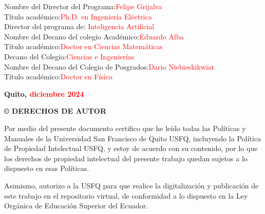 \documentclass[journal]{IEEEtran}
\newenvironment{customfontsize}{
    \fontsize{12}{14}\selectfont
}{}
\begin{document}
\begin{customfontsize}
Nombre del Director del Programa:\hspace{3cm}\textcolor{red} {Felipe Grijalva}\\
Título académico:\hspace{6.2cm}\textcolor{red}{Ph.D. en Ingeniería Eléctrica}\\
Director del programa de:\hspace{4.7cm}\textcolor{red}{ Inteligencia Artificial}
\vspace{30pt}
\\Nombre del Decano del colegio Académico:\hspace{1.6cm}\textcolor{red}{Eduardo Alba}\\ 
Título académico:\hspace{6.2cm}\textcolor{red}{Doctor en Ciencias Matemáticas}\\
Decano del Colegio:\hspace{5.8cm}\textcolor{red}{Ciencias e Ingenierías}
\vspace{30pt}
\\Nombre del Decano del Colegio de Posgrados:\hspace{1cm}\textcolor{red}{Dario Niebieskikwiat}\\
Título académico:\hspace{6.1cm}\textcolor{red}{Doctor en Física}

\end{customfontsize}

\begin{center}
\vspace{350pt}
\textbf{\fontsize{14}{16}\selectfont Quito, \textcolor{red}{diciembre 2024}}
\end{center}

\newpage
\begin{center}
\textbf{\fontsize{14}{16}\selectfont © DERECHOS DE AUTOR}\\
\vspace{10pt}
\end{center}


\fontsize{12}{14}\selectfont
{
\setlength{\parindent}{3em}
\hspace{1pt}

Por medio del presente documento certifico que he leído todas las Políticas y Manuales de la Universidad San Francisco de Quito USFQ, incluyendo la Política de Propiedad Intelectual USFQ, y estoy de acuerdo con su contenido, por lo que los derechos de propiedad intelectual del presente trabajo quedan sujetos a lo dispuesto en esas Políticas.

Asimismo, autorizo a la USFQ para que realice la digitalización y publicación de este trabajo en el repositorio virtual, de conformidad a lo dispuesto en la Ley Orgánica de Educación Superior del Ecuador.
}
\end{document}
